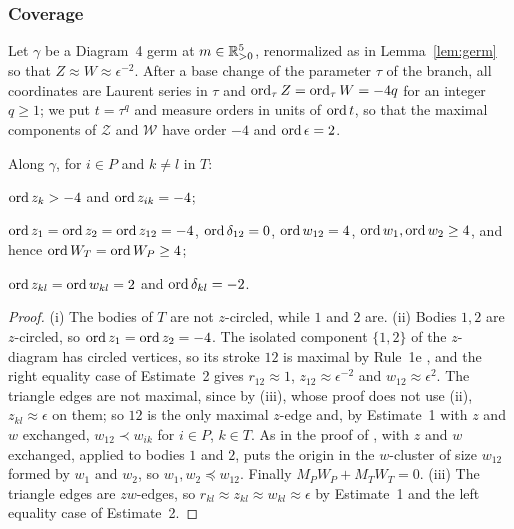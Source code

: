 \subsubsection{Coverage}\label{d4-cover}
Let $\gamma$ be a Diagram~4 germ at $m\in\mathbb{R}_{>0}^5$, renormalized as in Lemma~\ref{lem:germ} so that
$Z\approx W\approx\epsilon^{-2}$.  After a base change of the parameter $\tau$ of the branch,
all coordinates are Laurent series in $\tau$ and $\operatorname{ord}_\tau Z=\operatorname{ord}_\tau W=-4q$ for an integer
$q\ge1$; we put $t=\tau^q$ and measure orders in units of $\operatorname{ord} t$, so that the maximal
components of $\mathcal Z$ and $\mathcal W$ have order $-4$ and $\operatorname{ord}\epsilon=2$.

\begin{lemma}\label{lem:d4-val}
Along $\gamma$, for $i\in P$ and $k\ne l$ in $T$:
\begin{romanlist}
  \item $\operatorname{ord} z_k>-4$ and $\operatorname{ord} z_{ik}=-4$;
  \item $\operatorname{ord} z_1=\operatorname{ord} z_2=\operatorname{ord} z_{12}=-4$, $\operatorname{ord}\delta_{12}=0$, $\operatorname{ord} w_{12}=4$,
  $\operatorname{ord} w_1,\operatorname{ord} w_2\ge4$, and hence $\operatorname{ord} W_T=\operatorname{ord} W_P\ge4$;
  \item $\operatorname{ord} z_{kl}=\operatorname{ord} w_{kl}=2$ and $\operatorname{ord}\delta_{kl}=-2$.
\end{romanlist}
\end{lemma}

\begin{proof}
(i) The bodies of $T$ are not $z$-circled, while $1$ and $2$ are.
(ii) Bodies $1,2$ are $z$-circled, so $\operatorname{ord} z_1=\operatorname{ord} z_2=-4$.  The isolated component $\{1,2\}$
of the $z$-diagram has circled vertices, so its stroke $12$ is maximal by Rule~1e
\cite[p.~546]{AK}, and the right equality case of Estimate~2 \cite[p.~548]{AK} gives
$r_{12}\approx1$, $z_{12}\approx\epsilon^{-2}$ and $w_{12}\approx\epsilon^2$.  The triangle edges are
not maximal, since by (iii), whose proof does not use (ii), $z_{kl}\approx\epsilon$ on them; so
$12$ is the only maximal $z$-edge and, by Estimate~1
\cite[p.~548]{AK} with $z$ and $w$ exchanged, $w_{12}\prec w_{ik}$ for $i\in P$, $k\in T$.  As in
the proof of \cite[Prop.~4, p.~564]{AK}, \cite[Prop.~1, p.~559]{AK} with $z$ and $w$ exchanged,
applied to bodies $1$ and $2$, puts the origin in the $w$-cluster of size $w_{12}$ formed by
$w_1$ and $w_2$, so $w_1,w_2\preccurlyeq w_{12}$.  Finally $M_PW_P+M_TW_T=0$.
(iii) The triangle edges are $zw$-edges, so $r_{kl}\approx z_{kl}\approx w_{kl}\approx\epsilon$ by
Estimate~1 and the left equality case of Estimate~2.
\end{proof}


